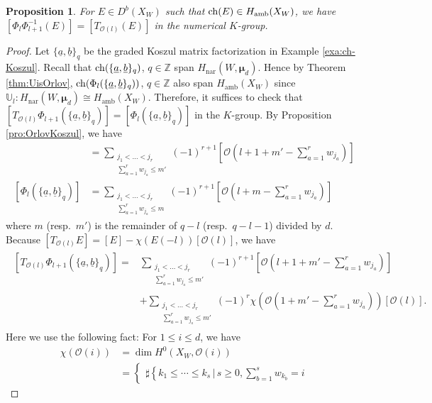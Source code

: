 \documentclass[11pt]{amsart}
\newtheorem{pro}[thm]{Proposition} %
\theoremstyle{definition} %
\theoremstyle{remark} %
\newcommand{\UU}{\mathbb U}
\newcommand{\ZZ}{\mathbb Z}
\newcommand{\nar}{\operatorname{nar}}
\newcommand{\ch}{{\rm ch}}
\newcommand{\bmu}{\boldsymbol{\mu}}
\newcommand{\cO}{\mathcal{O}}
\newcommand{\amb}{\operatorname{amb}}
\newcommand{\ua}{\underline{a}}
\newcommand{\ub}{\underline{b}}
\begin{document}
\begin{pro} 
\label{pro:spherical} 
For $E\in D^b(X_W)$ such that $\ch(E) \in H_{\amb}(X_W)$, 
we have 
$[\Phi_l \Phi_{l+1}^{-1}(E) ] = [T_{\cO(l)}(E)]$ 
in the numerical $K$-group.  
\end{pro} 
\begin{proof} 
Let $\{\ua,\ub\}_q$ be the graded Koszul matrix factorization 
in Example \ref{exa:ch-Koszul}. 
Recall that $\ch(\{\ua,\ub\}_q)$, $q\in \ZZ$ 
span $H_{\nar}(W,\bmu_d)$. 
Hence by Theorem \ref{thm:UisOrlov},  
$\ch(\Phi_l(\{\ua,\ub\}_q))$, $q\in \ZZ$ 
also span $H_{\amb}(X_W)$ 
since $\UU_l \colon H_{\nar}(W,\bmu_d) \cong 
H_{\amb}(X_W)$. 
Therefore, it suffices to check that 
$[T_{\cO(l)} \Phi_{l+1}(\{\ua,\ub\}_q)] = [\Phi_l(\{\ua,\ub\}_q)]$ 
in the $K$-group. 
By Proposition \ref{pro:OrlovKoszul}, we have 
\begin{align*} 
[\Phi_{l+1}(\{\ua,\ub\}_q)] & = 
\sum_{\substack{{j_1<\dots<j_r}\\ 
\sum_{a=1}^r w_{j_a}\le m'}} 
(-1)^{r+1} 
[\cO\left(l+ 1 + \textstyle m' - 
\sum_{a=1}^r w_{j_a}\right) ] \\ 
[\Phi_{l}(\{\ua,\ub\}_q)] & = 
\sum_{\substack{{j_1<\dots<j_r}\\ 
\sum_{a=1}^r w_{j_a}\le m }} 
(-1)^{r+1}
[\cO\left(l+ \textstyle m - 
\sum_{a=1}^r w_{j_a}\right)]  
\end{align*} 
where $m$ (resp.\ $m'$) 
is the remainder of $q-l$ (resp.\ $q-l-1$) divided by $d$. 
Because $[T_{\cO(l)} E] = [E] - \chi(E(-l)) [\cO(l)]$, we have 
\begin{align} 
\label{eq:twist-Phi_l+1}
\begin{split} 
[T_{\cO(l)} \Phi_{l+1}(\{\ua,\ub\}_q)] 
= & \sum_{\substack{{j_1<\dots<j_r}\\ 
\sum_{a=1}^r w_{j_a}\le m'}} 
(-1)^{r+1} 
[\cO\left(l+ 1 + \textstyle m' - 
\sum_{a=1}^r w_{j_a}\right) ] \\ 
& + \sum_{\substack{{j_1<\dots<j_r}\\ 
\sum_{a=1}^r w_{j_a}\le m'}} 
(-1)^{r} 
\chi(\cO\left( 1+ \textstyle m' - 
\sum_{a=1}^r w_{j_a}\right)) 
[\cO(l)].  
\end{split} 
\end{align} 
Here we use the following fact: For $1\le i\le d$, 
we have 
\begin{align*} 
\chi(\cO(i)) & = \dim H^0(X_W,\cO(i)) \\ 
& = 
\begin{cases} 
\sharp\left\{
k_1\le \cdots \le k_s \,|\, s\ge 0, \sum_{b=1}^s w_{k_b} = i

\end{cases}
\end{align*}
\end{proof}
\end{document}
